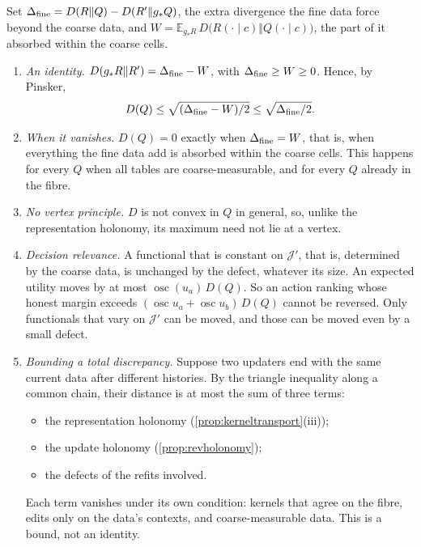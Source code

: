 \documentclass[11pt]{article}
\theoremstyle{definition}\newtheorem{definition}[theorem]{Definition}\newtheorem{remark}[theorem]{Remark}\newtheorem{example}[theorem]{Example}\newtheorem{problem}[theorem]{Open problem}\crefname{problem}{Problem}{Problems}
\begin{document}
\begin{proposition}\label{prop:refitdefect}
Set $\Delta_{\rm fine}=D(R\Vert Q)-D(R'\Vert g_*Q)$, the extra divergence the fine data force beyond the coarse data, and $W=\mathbb E_{g_*R}\,D\big(R(\cdot\mid c)\Vert Q(\cdot\mid c)\big)$, the part of it absorbed within the coarse cells.
\begin{enumerate}
\item[(i)] \emph{An identity.} $D(g_*R\Vert R')=\Delta_{\rm fine}-W$, with $\Delta_{\rm fine}\ge W\ge0$. Hence, by Pinsker,
\[
D(Q)\le\sqrt{(\Delta_{\rm fine}-W)/2}\le\sqrt{\Delta_{\rm fine}/2}.
\]
\item[(ii)] \emph{When it vanishes.} $D(Q)=0$ exactly when $\Delta_{\rm fine}=W$, that is, when everything the fine data add is absorbed within the coarse cells. This happens for every $Q$ when all tables are coarse-measurable, and for every $Q$ already in the fibre.
\item[(iii)] \emph{No vertex principle.} $D$ is not convex in $Q$ in general, so, unlike the representation holonomy, its maximum need not lie at a vertex.
\item[(iv)] \emph{Decision relevance.} A functional that is constant on $\mathcal J'$, that is, determined by the coarse data, is unchanged by the defect, whatever its size. An expected utility moves by at most $\operatorname{osc}(u_a)\,D(Q)$. So an action ranking whose honest margin exceeds $(\operatorname{osc}u_a+\operatorname{osc}u_b)\,D(Q)$ cannot be reversed. Only functionals that vary on $\mathcal J'$ can be moved, and those can be moved even by a small defect.
\item[(v)] \emph{Bounding a total discrepancy.} Suppose two updaters end with the same current data after different histories. By the triangle inequality along a common chain, their distance is at most the sum of three terms:
\begin{itemize}
\item the representation holonomy (\cref{prop:kerneltransport}(iii));
\item the update holonomy (\cref{prop:revholonomy});
\item the defects of the refits involved.
\end{itemize}
Each term vanishes under its own condition: kernels that agree on the fibre, edits only on the data's contexts, and coarse-measurable data. This is a bound, not an identity.
\end{enumerate}
\end{proposition}
\end{document}
